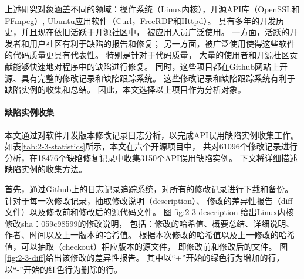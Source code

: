 上述研究对象涵盖不同的领域：操作系统（Linux内核），开源API库（OpenSSL和FFmpeg）,
Ubuntu应用软件（Curl，FreeRDP和Httpd）。
具有多年的开发历史，并且现在依旧活跃于开源社区中，
被应用人员广泛使用。
一方面，活跃的开发者和用户社区有利于缺陷的报告和修复；
另一方面，被广泛使用使得这些软件的代码质量更具有代表性。
特别是针对于代码质量，
大量的使用者和开源社区贡献能够快速地对程序中的缺陷进行修复。
同时，这些项目都在Github网站上开源、具有完整的修改记录和缺陷跟踪系统。
这些修改记录和缺陷跟踪系统有利于缺陷实例的收集和总结。
因此，本文选择以上项目作为分析对象。

\paragraph{缺陷实例收集}



本文通过对软件开发版本修改记录日志分析，以完成API误用缺陷实例收集工作。
如表\ref{tab:2-3-statistics}所示，本文在六个开源项目中，
共对61096个修改记录进行分析，在18476个缺陷修复记录中收集3150个API误用缺陷实例。
下文将详细描述缺陷实例的收集方法。

首先，通过Github上的日志记录追踪系统，对所有的修改记录进行下载和备份。
针对于每一次修改记录，抽取修改说明（description）、
修改的差异性报告（diff文件）以及修改前和修改后的源代码文件。
图\ref{fig:2-3-description}给出Linux内核修改sha：059c98599的修改说明，
包括：修改的哈希值、概要总结、详细说明、作者、时间以及上一版本的哈希值。
根据本次修改的哈希值以及上一修改的哈希值，可以抽取（checkout）相应版本的源文件，
即修改前和修改后的文件。
图\ref{fig:2-3-diff}给出该修改的差异性报告。
其中以“+”开始的绿色行为增加的行，以“-”开始的红色行为删除的行。




